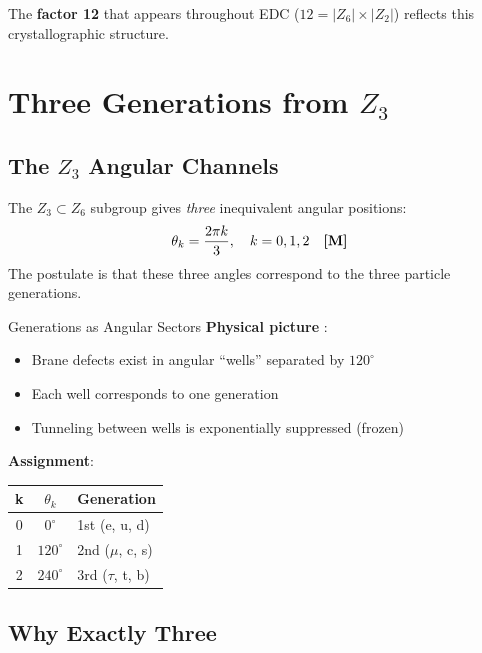 The \textbf{factor 12} that appears throughout EDC ($12 = |Z_6| \times |Z_2|$)
reflects this crystallographic structure.

\section{Three Generations from $Z_3$}
\label{sec:three_generations}

\subsection{The $Z_3$ Angular Channels}

The $Z_3 \subset Z_6$ subgroup gives \textit{three} inequivalent angular positions:
\begin{equation}
\theta_k = \frac{2\pi k}{3}, \quad k = 0, 1, 2 \quad \textbf{[M]}
\end{equation}
The postulate \tagP{} is that these three angles correspond to the three particle generations.

\begin{mechanism}{Generations as Angular Sectors}
\textbf{Physical picture} \tagP{}:
\begin{itemize}[nosep]
\item Brane defects exist in angular ``wells'' separated by $120^\circ$
\item Each well corresponds to one generation
\item Tunneling between wells is exponentially suppressed (frozen)
\end{itemize}

\textbf{Assignment}:
\begin{center}
\begin{tabular}{ccl}
\toprule
\textbf{k} & \textbf{$\theta_k$} & \textbf{Generation} \\
\midrule
0 & $0^\circ$ & 1st (e, u, d) \\
1 & $120^\circ$ & 2nd ($\mu$, c, s) \\
2 & $240^\circ$ & 3rd ($\tau$, t, b) \\
\bottomrule
\end{tabular}
\end{center}
\end{mechanism}

\subsection{Why Exactly Three}

